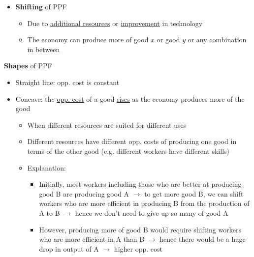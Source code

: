\documentclass{article}
\begin{document}
\begin{multicols}{2}
\begin{itemize}
\begin{itemize}
	\end{itemize}
	\item \textbf{Shifting} of PPF
\begin{itemize}
	\item Due to \underline{additional resources} or \underline{improvement} in technology
	\item The economy can produce more of good $x$ or good $y$ or any combination in between\\
\end{itemize}
\end{itemize}
\textbf{Shapes} of PPF
\begin{itemize}
	\item Straight line: opp. cost is constant
	\item Concave: the \underline{opp. cost} of a good \underline{rises} as the economy produces more of the good
	\begin{itemize}
		\item When different resources are suited for different uses
		\item Different resources have different opp. costs of producing one good in terms of the other good (e.g. different workers have different skills)
		\item Explanation:
			\begin{itemize}
			\item Initially, most workers including those who are better at producing good B are producing good A $\rightarrow$ to get more good B, we can shift workers who are more efficient in producing B from the production of A to B $\rightarrow$ hence we don't need to give up so many of good A
			\item However, producing more of good B would require shifting workers who are more efficient in A than B $\rightarrow$ hence there would be a huge drop in output of A $\rightarrow$ higher opp. cost
		\end{itemize}
	\end{itemize}
\end{itemize}



\end{multicols}
\end{document}
